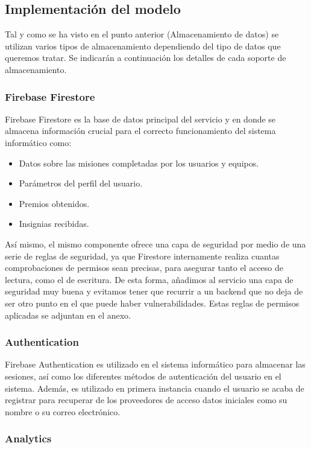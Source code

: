 \documentclass[twoside]{report}
\begin{document}
\subsection{Implementación del modelo}

Tal y como se ha visto en el punto anterior (Almacenamiento de datos) se utilizan varios tipos de almacenamiento dependiendo del tipo de datos que queremos tratar. Se indicarán a continuación los detalles de cada soporte de almacenamiento.

\subsubsection{Firebase Firestore}

Firebase Firestore es la base de datos principal del servicio y en donde se almacena información crucial para el correcto funcionamiento del sistema informático como:
\begin{itemize}
\item Datos sobre las misiones completadas por los usuarios y equipos.
\item Parámetros del perfil del usuario.
\item Premios obtenidos.
\item Insignias recibidas.
\end{itemize} 

Así mismo, el mismo componente ofrece una capa de seguridad por medio de una serie de reglas de seguridad, ya que Firestore internamente realiza cuantas comprobaciones de permisos sean precisas, para asegurar tanto el acceso de lectura, como el de escritura. De esta forma, añadimos al servicio una capa de seguridad muy buena y evitamos tener que recurrir a un backend que no deja de ser otro punto en el que puede haber vulnerabilidades. Estas reglas de permisos aplicadas se adjuntan en el anexo.

\subsubsection{Authentication}

Firebase Authentication es utilizado en el sistema informático para almacenar las sesiones, así como los diferentes métodos de autenticación del usuario en el sistema. Además, es utilizado en primera instancia cuando el usuario se acaba de registrar para recuperar de los proveedores de acceso datos iniciales como su nombre o su correo electrónico.

\subsubsection{Analytics}
\end{document}
